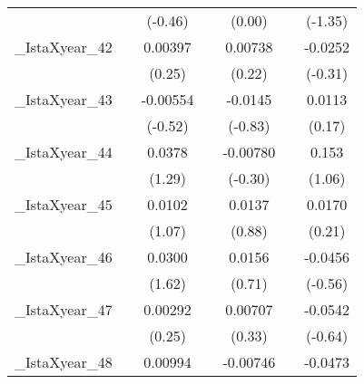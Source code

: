 {\begin{tabular}{l*{6}{c}}
            &                     &     (-0.46)         &                     &      (0.00)         &                     &     (-1.35)         \\
[1em]
\_IstaXyear\_42&                     &     0.00397         &                     &     0.00738         &                     &     -0.0252         \\
            &                     &      (0.25)         &                     &      (0.22)         &                     &     (-0.31)         \\
[1em]
\_IstaXyear\_43&                     &    -0.00554         &                     &     -0.0145         &                     &      0.0113         \\
            &                     &     (-0.52)         &                     &     (-0.83)         &                     &      (0.17)         \\
[1em]
\_IstaXyear\_44&                     &      0.0378         &                     &    -0.00780         &                     &       0.153         \\
            &                     &      (1.29)         &                     &     (-0.30)         &                     &      (1.06)         \\
[1em]
\_IstaXyear\_45&                     &      0.0102         &                     &      0.0137         &                     &      0.0170         \\
            &                     &      (1.07)         &                     &      (0.88)         &                     &      (0.21)         \\
[1em]
\_IstaXyear\_46&                     &      0.0300         &                     &      0.0156         &                     &     -0.0456         \\
            &                     &      (1.62)         &                     &      (0.71)         &                     &     (-0.56)         \\
[1em]
\_IstaXyear\_47&                     &     0.00292         &                     &     0.00707         &                     &     -0.0542         \\
            &                     &      (0.25)         &                     &      (0.33)         &                     &     (-0.64)         \\
[1em]
\_IstaXyear\_48&                     &     0.00994         &                     &    -0.00746         &                     &     -0.0473         \\

\end{tabular}}
